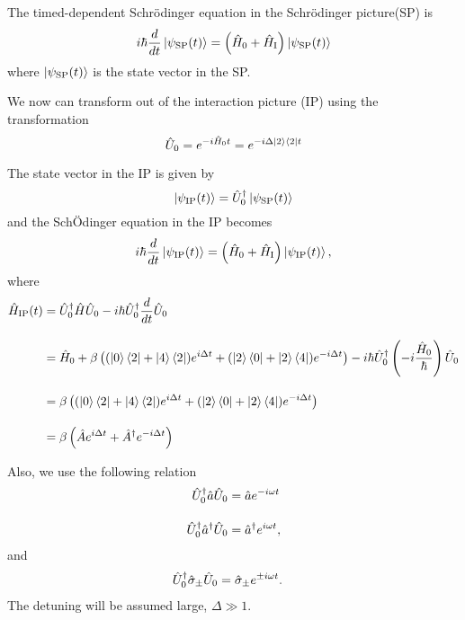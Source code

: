 The timed-dependent Schr\"{o}dinger equation in the Schr\"{o}dinger picture(SP) is
\begin{equation}
    i\hbar\frac{d}{dt}\ket{\psi_{\rm{SP}}(t)}
    =\left(
    \hat{H}_0+\hat{H}_{\rm{I}}
    \right)
    \ket{\psi_{\rm{SP}}(t)}
\end{equation}
where $\ket{\psi_{\rm{SP}}(t)}$ is the state vector in the SP.

We now can transform out of the interaction picture (IP) using the transformation
\begin{equation}
    {\hat{U}}_0=e^{-i\hat{H}_0 t}
    =e^{-i\Delta \ket{2}\bra{2} t}
\end{equation}

The state vector in the IP is given by
\begin{equation}
    \ket{\psi_{\rm{IP}}(t)}
    =\hat{U}_0^\dagger\ket{\psi_{\rm{SP}}(t)}
\end{equation}
and the Sch\"{O}dinger equation in the IP becomes
\begin{equation}
    i\hbar\frac{d}{dt}\ket{\psi_{\rm{IP}}(t)}
    =\left(
    \hat{H}_0+\hat{H}_{\rm{I}}
    \right)
    \ket{\psi_{\rm{IP}}(t)},
\end{equation}
where
\begin{align}
    \hat{H}_{\rm{IP}}(t)
    &=\hU_0^\dagger\hat{H}\hU_0
    -i\hbar\hat{U}_0^\dagger\frac{d}{dt}\hU_0\\[10pt]
    &=\hat{H}_0 + \beta \left(
    (\ket{0}\bra{2} + \ket{4}\bra{2})e^{i\Delta t} 
    + (\ket{2}\bra{0} + \ket{2}\bra{4})e^{-i\Delta t} 
    \right)
    -i\hbar\hat{U}_0^\dagger\left(
    -i\frac{\hat{H}_0}{\hbar}
    \right)\hU_0\\[10pt]
    &=\beta \left(
    (\ket{0}\bra{2} + \ket{4}\bra{2})e^{i\Delta t} 
    + (\ket{2}\bra{0} + \ket{2}\bra{4})e^{-i\Delta t} 
    \right)\nn[10pt]
    &=\beta \left(
    \hat{A}e^{i\Delta t} 
    + \hat{A}^{\dagger}e^{-i\Delta t} 
    \right)
\end{align}

Also, we use the following relation
\begin{align}
    {\hat{U}}^{\dagger}_0\hat{a}{\hat{U}}_0&=\hat{a}e^{-i\omega t}\\[10pt]
    {\hat{U}}^{\dagger}_0\hat{a}^{\dagger}{\hat{U}}_0&=\hat{a}^{\dagger}e^{i\omega t},
\end{align}
and 
\begin{align}
    {\hat{U}}^{\dagger}_0\hat{\sigma}_{\pm}{\hat{U}}_0&=\hat{\sigma}_{\pm}e^{\pm i\omega t}.
\end{align}
The detuning will be assumed large, $\Delta \gg 1$.


